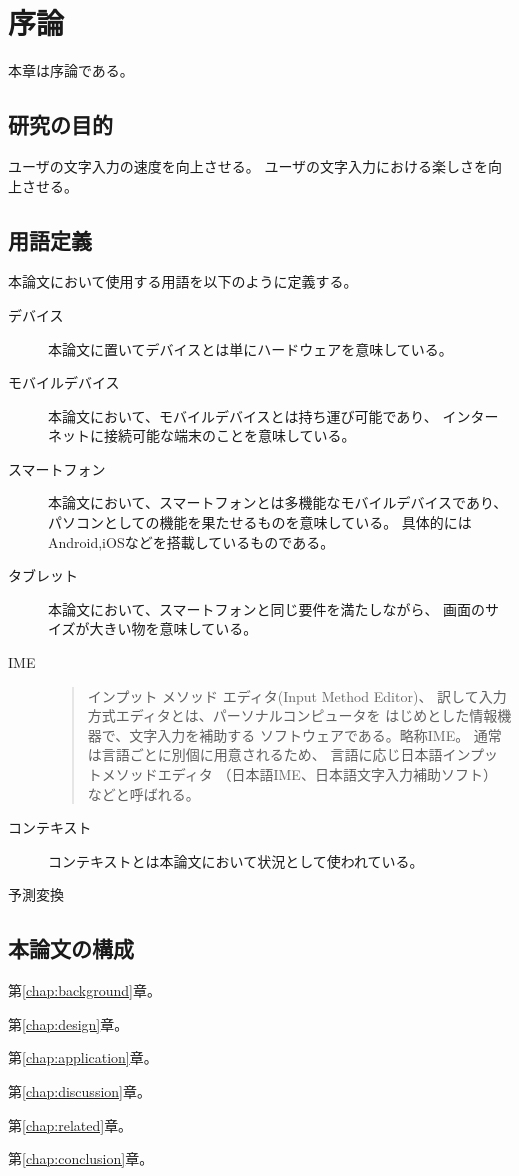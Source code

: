 \chapter{序論}
\label{chap:introduction}
本章は序論である。

\newpage
\section{研究の目的}
ユーザの文字入力の速度を向上させる。
ユーザの文字入力における楽しさを向上させる。
\section{用語定義}

本論文において使用する用語を以下のように定義する。

\begin{description}
  \item [デバイス]
    本論文に置いてデバイスとは単にハードウェアを意味している。
  \item [モバイルデバイス]
    本論文において、モバイルデバイスとは持ち運び可能であり、
    インターネットに接続可能な端末のことを意味している。
  \item [スマートフォン]
    本論文において、スマートフォンとは多機能なモバイルデバイスであり、
    パソコンとしての機能を果たせるものを意味している。
    具体的にはAndroid,iOSなどを搭載しているものである。
  \item [タブレット]
    本論文において、スマートフォンと同じ要件を満たしながら、
    画面のサイズが大きい物を意味している。
  \item [IME]
    \begin{quote}
      インプット メソッド エディタ(Input Method Editor)、
      訳して入力方式エディタとは、パーソナルコンピュータを
      はじめとした情報機器で、文字入力を補助する
      ソフトウェアである。略称IME。
      通常は言語ごとに別個に用意されるため、
      言語に応じ日本語インプットメソッドエディタ
      （日本語IME、日本語文字入力補助ソフト）
      などと呼ばれる。\cite[出典]{ime}
    \end{quote}
  \item [コンテキスト]
    コンテキストとは本論文において状況として使われている。
  \item [予測変換]

\end{description}

\section{本論文の構成}


第\ref{chap:background}章。

第\ref{chap:design}章。

第\ref{chap:application}章。

第\ref{chap:discussion}章。

第\ref{chap:related}章。

第\ref{chap:conclusion}章。
